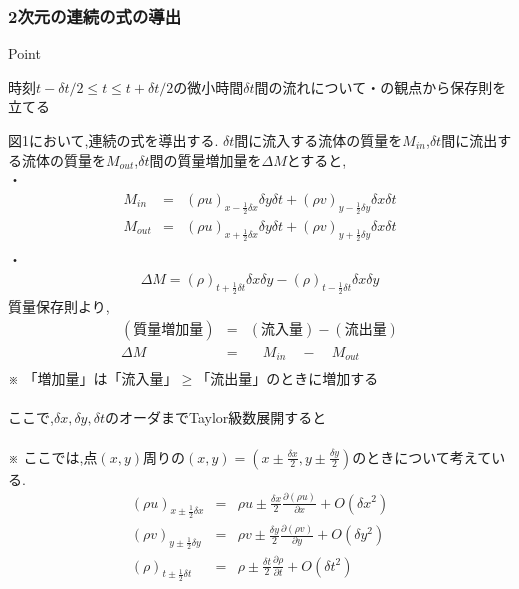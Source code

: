 \documentclass[a4paper]{jsarticle}
\begin{document}
\subsubsection{2次元の連続の式の導出}
\begin{itembox}[l]{Point}
    \begin{center}
        時刻$t-\delta t/2\leq t \leq t+\delta t/2$の微小時間$\delta t$間の流れについて・の観点から保存則を立てる
    \end{center}
\end{itembox}
図1において,連続の式を導出する.
\noindent$\delta t$間に流入する流体の質量を$M_{in}$,$\delta t$間に流出する流体の質量を$M_{out}$,$\delta t$間の質量増加量を$\Delta M$とすると,\\
・
\begin{eqnarray*}
    M_{in}&=&\left(\rho u\right)_{x-\frac{1}{2}\delta x}\delta y \delta t+\left(\rho v\right)_{y-\frac{1}{2}\delta y}\delta x \delta t\\
    M_{out}&=&\left(\rho u\right)_{x+\frac{1}{2}\delta x}\delta y \delta t+\left(\rho v\right)_{y+\frac{1}{2}\delta y}\delta x \delta t\\
\end{eqnarray*}
\noindent
・
\begin{eqnarray*}
    \Delta M=\left(\rho\right)_{t+\frac{1}{2}\delta t}\delta x \delta y-\left(\rho\right)_{t-\frac{1}{2}\delta t}\delta x \delta y
\end{eqnarray*}
質量保存則より,
\begin{eqnarray*}
    (質量増加量)&=&(流入量)-(流出量)\\
    \Delta M&=&\quad M_{in}\quad -\quad M_{out}\\
\end{eqnarray*}
※ 「増加量」は「流入量」$\geq$「流出量」のときに増加する\\
\\
ここで,$\delta x, \delta y, \delta t$のオーダまでTaylor級数展開すると\\
\\
※ ここでは,点$(x,y)$周りの$\left(x,y\right)=\left(x\pm \frac{\delta x}{2},y\pm \frac{\delta y}{2}\right)$のときについて考えている.
\begin{eqnarray*}
    \left(\rho u\right)_{x\pm \frac{1}{2}\delta x}&=&\rho u\pm \frac{\delta x}{2}\frac{\partial\left(\rho u\right)}{\partial x}+O\left(\delta x^2\right)\\
    \left(\rho v\right)_{y\pm \frac{1}{2}\delta y}&=&\rho v\pm \frac{\delta y}{2}\frac{\partial\left(\rho v\right)}{\partial y}+O\left(\delta y^2\right)\\
    \left(\rho\right)_{t\pm \frac{1}{2}\delta t}&=&\rho \pm \frac{\delta t}{2}\frac{\partial \rho}{\partial t}+O\left(\delta t^2\right)
\end{eqnarray*}
\end{document}
